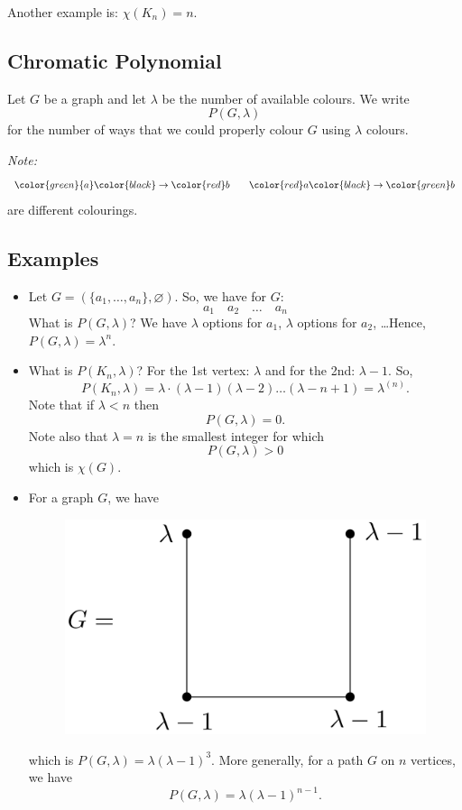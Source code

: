 \documentclass[11pt]{article}
\let\emptyset\varnothing
\begin{document}
    \vspace{1em}

    Another example is: \(\chi (K_n) = n\).

    \subsection{Chromatic Polynomial}

    Let $G$ be a graph and let $\lambda$ be the number of available colours. We write \[P(G, \lambda)\] for the number of ways that we could properly colour $G$ using \(\lambda\) colours. 

    \emph{Note:} \[\color{green}{a} \color{black} \rightarrow \color{red} b \qquad \color{red} a \color{black} \rightarrow \color{green} b\] are different colourings.

    \subsection{Examples}

    \begin{itemize}
        \item Let \(G = (\{a_1, \dots, a_n\}, \emptyset)\). So, we have for $G$: \[a_1 \quad a_2 \quad \dots \quad a_n\] What is \(P(G, \lambda)\)? We have \(\lambda\) options for \(a_1\), \(\lambda\) options for \(a_2\), \dots Hence, \(P(G,\lambda) = \lambda^{n}\).
        \item What is \(P(K_n, \lambda)\)? For the 1st vertex: \(\lambda\) and for the 2nd: \(\lambda - 1\). So, \[P(K_n,\lambda) = \lambda \cdot (\lambda - 1)(\lambda -2) \dots (\lambda - n + 1) = \lambda^{(n)}.\] Note that if \(\lambda < n\) then \[P(G,\lambda) = 0.\] Note also that \(\lambda=n\) is the smallest integer for which \[P(G,\lambda) > 0\] which is \(\chi (G)\). 
        \item For a graph $G$, we have 
        \begin{figure}[H]
            \centering
            \includegraphics[scale=0.1]{poly1.png}
        \end{figure}
        which is \(P(G,\lambda) = \lambda(\lambda - 1)^3.\) More generally, for a path $G$ on $n$ vertices, we have \[P(G,\lambda) = \lambda (\lambda - 1)^{n-1}.\]
    \end{itemize}
\end{document}
